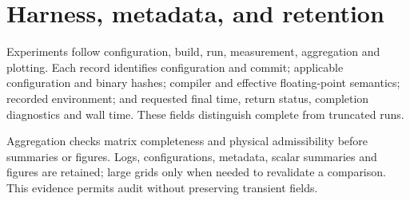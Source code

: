 \section{Harness, metadata, and retention}
\label{sec:ch3-harness-metadata}

Experiments follow configuration, build, run, measurement, aggregation and
plotting. Each record identifies configuration and commit; applicable
configuration and binary hashes; compiler and effective floating-point
semantics; recorded environment; and requested final time, return status,
completion diagnostics and wall time. These fields distinguish complete from
truncated runs.

Aggregation checks matrix completeness and physical admissibility before
summaries or figures. Logs, configurations, metadata, scalar summaries and
figures are retained; large grids only when needed to revalidate a comparison.
This evidence permits audit without preserving transient fields.
